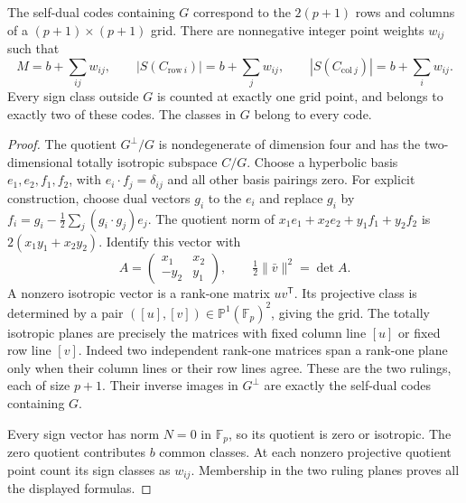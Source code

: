 \begin{theorem}
The self-dual codes containing $G$ correspond to the $2(p+1)$ rows
and columns of a $(p+1)\times(p+1)$ grid. There are nonnegative
integer point weights $w_{ij}$ such that
\[
 M=b+\sum_{ij}w_{ij},\qquad
 |S(C_{\mathrm{row}\ i})|=b+\sum_jw_{ij},\qquad
 |S(C_{\mathrm{col}\ j})|=b+\sum_iw_{ij}.
\]
Every sign class outside $G$ is counted at exactly one grid point,
and belongs to exactly two of these codes. The classes in $G$ belong
to every code.
\end{theorem}
\begin{proof}
The quotient $G^\perp/G$ is nondegenerate of dimension four and has
the two-dimensional totally isotropic subspace $C/G$. Choose a
hyperbolic basis $e_1,e_2,f_1,f_2$, with $e_i\cdot f_j=\delta_{ij}$
and all other basis pairings zero. For explicit construction, choose
dual vectors $g_i$ to the $e_i$ and replace
$g_i$ by $f_i=g_i-\frac12\sum_j(g_i\cdot g_j)e_j$.
The quotient norm of $x_1e_1+x_2e_2+y_1f_1+y_2f_2$ is
$2(x_1y_1+x_2y_2)$. Identify this vector with
\[
 A=\begin{pmatrix}x_1&x_2\\-y_2&y_1\end{pmatrix},
 \qquad \tfrac12\|\bar v\|^2=\det A.
\]
A nonzero isotropic vector is a rank-one matrix $uv^{\mathsf T}$.
Its projective class is determined by a pair
$([u],[v])\in\mathbb P^1(\mathbb F_p)^2$, giving the grid.
The totally isotropic planes are precisely the matrices with fixed
column line $[u]$ or fixed row line $[v]$. Indeed two independent
rank-one matrices span a rank-one plane only when their column lines
or their row lines agree. These are the two rulings, each of size $p+1$.
Their inverse images in $G^\perp$ are exactly the self-dual codes
containing $G$.

Every sign vector has norm $N=0$ in $\mathbb F_p$, so its quotient
is zero or isotropic. The zero quotient contributes $b$ common
classes. At each nonzero projective quotient point count its sign
classes as $w_{ij}$. Membership in the two ruling planes proves
all the displayed formulas.
\end{proof}

